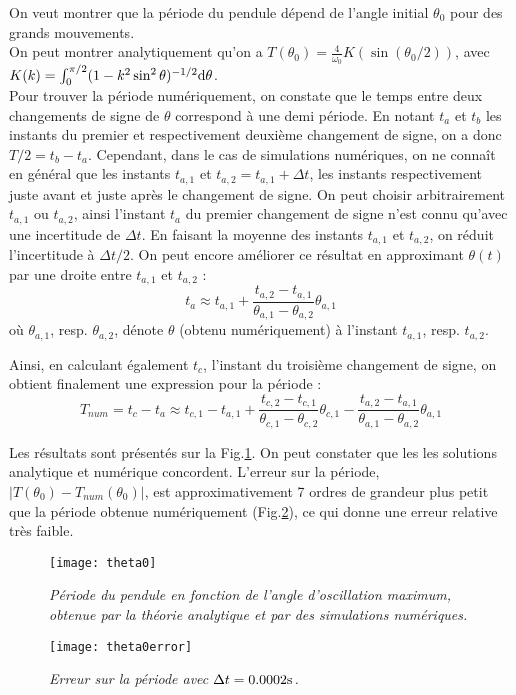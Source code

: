 \documentclass[a4paper,12pt,oneside]{article}
\def \be {\begin{equation}}
\def \ee {\end{equation}}
\def \dd  {{\rm d}}
\def \t {\theta}
\begin{document}
On veut montrer que la période du pendule dépend de l'angle initial $\t_0$ pour des grands mouvements. \\
On peut montrer analytiquement qu'on a $T(\t_0)=\frac{4}{\omega_0}K(\sin{(\t_0/2)})$, avec $K(k)=\int_{0}^{\pi/2}(1-k^2\sin^2\t)^{-1/2}\dd \t$. \\
Pour trouver la période numériquement, on constate que le temps entre deux changements de signe de $\t$ correspond à une demi période. En notant $t_a$ et $t_b$ les instants du premier et respectivement deuxième changement de signe, on a donc $T/2=t_b-t_a$. Cependant, dans le cas de simulations numériques, on ne connaît en général que les instants $t_{a,1}$ et $t_{a,2}=t_{a,1}+\Delta t$, les instants respectivement juste avant et juste après le changement de signe. On peut choisir arbitrairement $t_{a,1}$ ou $t_{a,2}$, ainsi l'instant $t_a$ du premier changement de signe n'est connu qu'avec une incertitude de $\Delta t$. En faisant la moyenne des instants $t_{a,1}$ et $t_{a,2}$, on réduit l'incertitude à $\Delta t /2$. On peut encore améliorer ce résultat en approximant $\t(t)$ par une droite entre $t_{a,1}$ et $t_{a,2}$ :
\be
t_a \approx t_{a,1} + \frac{t_{a,2}-t_{a,1}}{ \t_{a,1}-\t_{a,2}} \t_{a,1}
\ee
où $\t_{a,1}$, resp. $\t_{a,2}$, dénote $\t$ (obtenu numériquement) à l'instant $t_{a,1}$, resp. $t_{a,2}$. 

Ainsi, en calculant également $t_c$, l'instant du troisième changement de signe, on obtient finalement une expression pour la période :
\be 
T_{num}=t_c-t_a \approx  t_{c,1} - t_{a,1} + \frac{t_{c,2}-t_{c,1}}{\t_{c,1}-\t_{c,2}} \t_{c,1} - \frac{t_{a,2}-t_{a,1}}{\t_{a,1}-\t_{a,2}} \t_{a,1}
\ee 

Les résultats sont présentés sur la Fig.\ref{theta0}. On peut constater que les les solutions analytique et numérique concordent. L'erreur sur la période, $\lvert T(\t_0)-T_{num}(\t_0) \rvert$, est approximativement 7 ordres de grandeur plus petit que la période obtenue numériquement (Fig.\ref{theta0error}), ce qui donne une erreur relative très faible.
\begin{figure}[H]
    \centerline{\texttt{[image: theta0]}}
\caption{ \label{theta0}\em
Période du pendule en fonction de l'angle d'oscillation maximum, obtenue par la théorie analytique et par des simulations numériques.
}
\end{figure}


\begin{figure}[H]
    \centerline{\texttt{[image: theta0error]}}
\caption{ \label{theta0error}\em
Erreur sur la période avec $\Delta t=0.0002\rm{s}$.
}
\end{figure}
\end{document}
